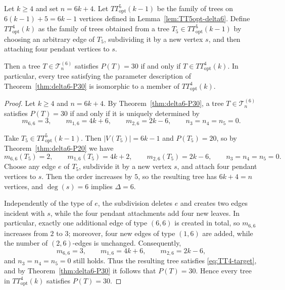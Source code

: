 \documentclass[preprint,12pt]{elsarticle}
\begin{document}
\begin{lemma}
\label{lem:TT4opt-delta6}
Let $k\ge 4$ and set $n=6k+4$.
Let $TT^5_{\mathrm{opt}}(k-1)$ be the family of trees on $6(k-1)+5=6k-1$ vertices
defined in Lemma~\ref{lem:TT5opt-delta6}.
Define $TT^4_{\mathrm{opt}}(k)$ as the family of trees obtained from a tree
$T_5\in TT^5_{\mathrm{opt}}(k-1)$ by choosing an arbitrary edge of $T_5$,
subdividing it by a new vertex $s$, and then attaching four pendant vertices to
$s$.

Then a tree $T\in\mathcal{T}^{(6)}_n$ satisfies $P(T)=30$ if and only if
$T\in TT^4_{\mathrm{opt}}(k)$.
In particular, every tree satisfying the parameter description of
Theorem~\ref{thm:delta6-P30} is isomorphic to a member of $TT^4_{\mathrm{opt}}(k)$.
\end{lemma}

\begin{proof}
Let $k\ge 4$ and $n=6k+4$.
By Theorem~\ref{thm:delta6-P30}, a tree $T\in\mathcal{T}^{(6)}_n$ satisfies
$P(T)=30$ if and only if it is uniquely determined by
\begin{equation}
m_{6,6}=3,\qquad
m_{1,6}=4k+6,\qquad
m_{2,6}=2k-6,
\qquad
n_3=n_4=n_5=0.
\label{eq:TT4-target}
\end{equation}

Take $T_5\in TT^5_{\mathrm{opt}}(k-1)$.
Then $|V(T_5)|=6k-1$ and $P(T_5)=20$, so by Theorem~\ref{thm:delta6-P20} we have
\[
m_{6,6}(T_5)=2,\qquad
m_{1,6}(T_5)=4k+2,\qquad
m_{2,6}(T_5)=2k-6,
\qquad
n_3=n_4=n_5=0.
\]
Choose any edge $e$ of $T_5$, subdivide it by a new vertex $s$, and attach four
pendant vertices to $s$.
Then the order increases by $5$, so the resulting tree has $6k+4=n$ vertices, and
$\deg(s)=6$ implies $\Delta=6$.

Independently of the type of $e$, the subdivision deletes $e$ and creates two
edges incident with $s$, while the four pendant attachments add four new leaves.
In particular, exactly one additional edge of type $(6,6)$ is created in total,
so $m_{6,6}$ increases from $2$ to $3$; moreover, four new edges of type $(1,6)$
are added, while the number of $(2,6)$-edges is unchanged.
Consequently,
\[
m_{6,6}=3,\qquad m_{1,6}=4k+6,\qquad m_{2,6}=2k-6,
\]
and $n_3=n_4=n_5=0$ still holds.
Thus the resulting tree satisfies \eqref{eq:TT4-target}, and by
Theorem~\ref{thm:delta6-P30} it follows that $P(T)=30$.
Hence every tree in $TT^4_{\mathrm{opt}}(k)$ satisfies $P(T)=30$.


\end{proof}
\end{document}
